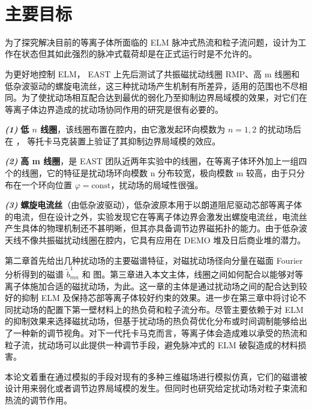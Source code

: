 

​\section{主要目标}
为了探究解决目前的\Hmode 等离子体所面临的 ELM 脉冲式热流和粒子流问题，\iter 设计为工作在\Hmode 状态但其如此强烈的脉冲式载荷却是在正式运行时是不允许的。

为更好地控制 ELM， EAST 上先后测试了共振磁扰动线圈 RMP、高 m 线圈和低杂波驱动的螺旋电流丝，这三种扰动场产生机制有所差异，适用的范围也不尽相同。为了使扰动场相互配合达到最优的弱化乃至抑制边界局域模的效果，对它们在等离子体边界造成的扰动场协同作用的研究是很有必要的。

\textit{\textbf{(1)}} \textbf{低 $n$ 线圈}，该线圈布置在腔内，由它激发起环向模数为 $n=1,2$ 的扰动场后在 \east， \ddd 等托卡马克装置上验证了其抑制边界局域模的效应。 

\textit{\textbf{(2)}} \textbf{高 m 线圈}，是 EAST 团队近两年实验中的线圈，在等离子体环外加上一组四个的线圈，它的特征是扰动场环向模数 n 分布较宽，极向模数 m 较高，由于只分布在一个环向位置 $\varphi=\text{const}$，扰动场的局域性很强。 


\textit{\textbf{(3)}} \textbf{螺旋电流丝}（由低杂波驱动），低杂波原本用于以朗道阻尼驱动芯部等离子体的电流，但在设计之外，实验发现它在等离子体边界会激发出螺旋电流丝，电流丝产生具体的物理机制还不甚明晰，但其亦具备调节边界磁拓扑的能力。由于低杂波天线不像共振磁扰动线圈在腔内，它具有应用在 DEMO 堆及日后商业堆的潜力。

第二章首先给出几种扰动场的主要磁谱特征，对磁扰动场径向分量在磁面 Fourier 分析得到的磁谱 $\tilde{b}^1_{mn}$ 和 \Poincare 图。第三章进入本文主体，线圈之间如何配合以能够对等离子体施加合适的磁扰动场，为此。这一章的主体是通过扰动场之间的配合达到较好的抑制 ELM 及保持芯部等离子体较好约束的效果。进一步在第三章中将讨论不同扰动场的配置下第一壁材料上的热负荷和粒子流分布。尽管主要依赖于对 ELM 的抑制效果来选择磁扰动场，但基于扰动场的热负荷优化分布或时间调制能够给出了一种新的调节视角。对下一代托卡马克而言，\Hmode 等离子体会造成难以承受的热流和粒子流，扰动场可以此提供一种调节手段，避免脉冲式的 ELM 破裂造成的材料损害。

本论文着重在通过模拟的手段对现有的多种三维磁场进行模拟仿真，它们的磁谱被设计用来弱化或者调节边界局域模的发生。但同时也研究给定扰动场对粒子束流和热流的调节作用。
